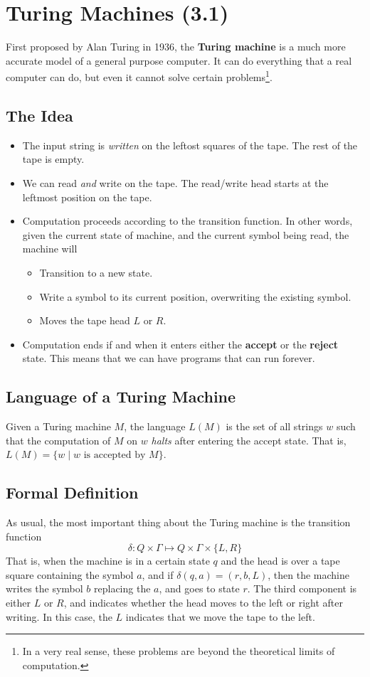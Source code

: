\documentclass[letterpaper]{article}
\begin{document}
\section{Turing Machines (3.1)}
First proposed by Alan Turing in 1936, the \textbf{Turing machine} is a much more accurate model of a general purpose computer. It can do everything that a real computer can do, but even it cannot solve certain problems\footnote{In a very real sense, these problems are beyond the theoretical limits of computation.}.

\subsection{The Idea}
\begin{itemize}
    \item The input string is \emph{written} on the leftost squares of the tape. The rest of the tape is empty. 
    \item We can read \emph{and} write on the tape. The read/write head starts at the leftmost position on the tape. 
    \item Computation proceeds according to the transition function. In other words, given the current state of machine, and the current symbol being read, the machine will 
    \begin{itemize}
        \item Transition to a new state.
        \item Write a symbol to its current position, overwriting the existing symbol.
        \item Moves the tape head $L$ or $R$. 
    \end{itemize}
    \item Computation ends if and when it enters either the \textbf{accept} or the \textbf{reject} state. This means that we can have programs that can run forever. 
\end{itemize}

\subsection{Language of a Turing Machine}
Given a Turing machine $M$, the language $L(M)$ is the set of all strings $w$ such that the computation of $M$ on $w$ \emph{halts} after entering the accept state. That is, $L(M) = \{w \mid w \text{ is accepted by } M\}$.

\subsection{Formal Definition}
As usual, the most important thing about the Turing machine is the transition function 
\[\delta: Q \times \Gamma \mapsto Q \times \Gamma \times \{L, R\}\]
That is, when the machine is in a certain state $q$ and the head is over a tape square containing the symbol $a$, and if $\delta(q, a) = (r, b, L)$, then the machine writes the symbol $b$ replacing the $a$, and goes to state $r$. The third component is either $L$ or $R$, and indicates whether the head moves to the left or right after writing. In this case, the $L$ indicates that we move the tape to the left. 
\end{document}
